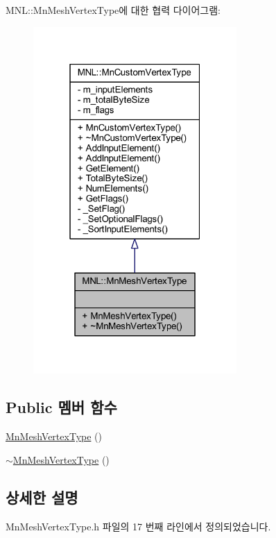 M\+NL\+:\+:Mn\+Mesh\+Vertex\+Type에 대한 협력 다이어그램\+:\nopagebreak
\begin{figure}[H]
\begin{center}
\leavevmode
\includegraphics[width=220pt]{class_m_n_l_1_1_mn_mesh_vertex_type__coll__graph}
\end{center}
\end{figure}
\subsection*{Public 멤버 함수}
\begin{DoxyCompactItemize}
\item 
\hyperlink{class_m_n_l_1_1_mn_mesh_vertex_type_a54bd7f4f72e1d8a0d470e4778a262596}{Mn\+Mesh\+Vertex\+Type} ()
\item 
\hyperlink{class_m_n_l_1_1_mn_mesh_vertex_type_aa50f0d7d9e5bd3189fb26e8cdff91472}{$\sim$\+Mn\+Mesh\+Vertex\+Type} ()
\end{DoxyCompactItemize}


\subsection{상세한 설명}


Mn\+Mesh\+Vertex\+Type.\+h 파일의 17 번째 라인에서 정의되었습니다.



